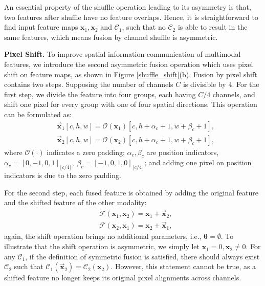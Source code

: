 \documentclass[sigconf]{acmart}
\begin{document}
An essential property of the shuffle operation leading to its asymmetry is that, two features after shuffle have no feature overlaps. Hence, it is straightforward to find input feature maps $\bm{x}_1, \bm{x}_2$ and $\mathcal{C}_1$, such that no $\mathcal{C}_2$ is able to result in the same features, which means fusion by channel shuffle is asymmetric. 

\textbf{Pixel Shift.}\label{sec:pixel_shift} 
To improve spatial information communication of multimodal features, we introduce the second asymmetric fusion operation which uses pixel shift on feature maps, as shown in Figure \ref{shuffle_shift}(b). Fusion by pixel shift contains two steps. Supposing the number of channels $C$ is divisible by $4$. For the first step, we divide the feature into four groups, each having $C/4$ channels, and shift one pixel for every group with one of four spatial directions. This operation can be formulated as:
\begin{equation}
\begin{split}
&\vec{\bm{x}}_1[c,h,w]=\mathcal{O}(\bm{x}_1)[c,h+\alpha_c+1,w+\beta_c+1],\\
&\vec{\bm{x}}_2[c,h,w]=\mathcal{O}(\bm{x}_2)[c,h+\alpha_c+1,w+\beta_c+1],
\end{split}
\end{equation}
where $\mathcal{O}(\cdot)$ indicates a zero padding; $\alpha_c,\beta_c$ are position indicators, $\alpha_c=[0,-1,0,1]_{\lfloor c/4\rfloor},\;\beta_c=[-1,0,1,0]_{\lfloor c/4\rfloor}$; and adding one pixel on position indicators is due to the zero padding.

For the second step, each fused feature is obtained by adding the original feature and the shifted feature of the other modality:
\begin{equation}
\begin{split}
&\mathcal{F}(\bm{x}_1, \bm{x}_2)=\bm{x}_1+\vec{\bm{x}}_2,\\
&\mathcal{F}(\bm{x}_2, \bm{x}_1)=\bm{x}_2+\vec{\bm{x}}_1,
\end{split}
\end{equation}
again, the shift operation brings no additional parameters, i.e., $\bm{\theta}=\emptyset$. To illustrate that the shift operation is asymmetric, we simply let $\bm{x}_1=0,\bm{x}_2\ne0$. For any $\mathcal{C}_1$, if the definition of symmetric fusion is satisfied, there should always exist $\mathcal{C}_2$ such that $\mathcal{C}_1(\vec{\bm{x}}_2)=\mathcal{C}_2(\bm{x}_2)$. However, this statement cannot be true, as a shifted feature no longer keeps its original pixel alignments across channels.
\end{document}
